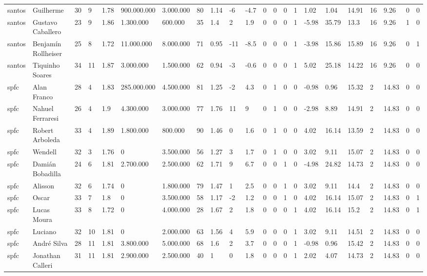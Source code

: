 \begin{longtable}{llllllllllllllllllllll}
santos & Guilherme & 30 & 9 & 1.78 & 900.000.000 & 3.000.000 & 80 & 1.14 & -6 & -4.7 & 0 & 0 & 0 & 1 & 1.02 & 1.04 & 14.91 & 16 & 9.26 & 0 & 0 \\
santos & Gustavo Caballero & 23 & 9 & 1.86 & 1.300.000 & 600.000 & 35 & 1.4 & 2 & 1.9 & 0 & 0 & 0 & 1 & -5.98 & 35.79 & 13.3 & 16 & 9.26 & 1 & 0 \\
santos & Benjamín Rollheiser & 25 & 8 & 1.72 & 11.000.000 & 8.000.000 & 71 & 0.95 & -11 & -8.5 & 0 & 0 & 0 & 1 & -3.98 & 15.86 & 15.89 & 16 & 9.26 & 0 & 1 \\
santos & Tiquinho Soares & 34 & 11 & 1.87 & 3.000.000 & 1.500.000 & 62 & 0.94 & -3 & -0.6 & 0 & 0 & 0 & 1 & 5.02 & 25.18 & 14.22 & 16 & 9.26 & 0 & 0 \\
spfc & Alan Franco & 28 & 4 & 1.83 & 285.000.000 & 4.500.000 & 81 & 1.25 & -2 & 4.3 & 0 & 1 & 0 & 0 & -0.98 & 0.96 & 15.32 & 2 & 14.83 & 0 & 0 \\
spfc & Nahuel Ferraresi & 26 & 4 & 1.9 & 4.300.000 & 3.000.000 & 77 & 1.76 & 11 & 9 & 0 & 1 & 0 & 0 & -2.98 & 8.89 & 14.91 & 2 & 14.83 & 0 & 0 \\
spfc & Robert Arboleda & 33 & 4 & 1.89 & 1.800.000 & 800.000 & 90 & 1.46 & 0 & 1.6 & 0 & 1 & 0 & 0 & 4.02 & 16.14 & 13.59 & 2 & 14.83 & 0 & 0 \\
spfc & Wendell & 32 & 3 & 1.76 & 0 & 3.500.000 & 56 & 1.27 & 3 & 1.7 & 0 & 1 & 0 & 0 & 3.02 & 9.11 & 15.07 & 2 & 14.83 & 0 & 0 \\
spfc & Damián Bobadilla & 24 & 6 & 1.81 & 2.700.000 & 2.500.000 & 62 & 1.71 & 9 & 6.7 & 0 & 0 & 1 & 0 & -4.98 & 24.82 & 14.73 & 2 & 14.83 & 0 & 0 \\
spfc & Alisson & 32 & 6 & 1.74 & 0 & 1.800.000 & 79 & 1.47 & 1 & 2.5 & 0 & 0 & 1 & 0 & 3.02 & 9.11 & 14.4 & 2 & 14.83 & 0 & 0 \\
spfc & Oscar & 33 & 7 & 1.8 & 0 & 3.500.000 & 58 & 1.17 & -2 & 1.2 & 0 & 0 & 1 & 0 & 4.02 & 16.14 & 15.07 & 2 & 14.83 & 0 & 1 \\
spfc & Lucas Moura & 33 & 8 & 1.72 & 0 & 4.000.000 & 28 & 1.67 & 2 & 1.8 & 0 & 0 & 0 & 1 & 4.02 & 16.14 & 15.2 & 2 & 14.83 & 0 & 1 \\
spfc & Luciano & 32 & 10 & 1.81 & 0 & 2.000.000 & 63 & 1.56 & 4 & 5.9 & 0 & 0 & 0 & 1 & 3.02 & 9.11 & 14.51 & 2 & 14.83 & 0 & 0 \\
spfc & André Silva & 28 & 11 & 1.81 & 3.800.000 & 5.000.000 & 68 & 1.6 & 2 & 3.7 & 0 & 0 & 0 & 1 & -0.98 & 0.96 & 15.42 & 2 & 14.83 & 0 & 0 \\
spfc & Jonathan Calleri & 31 & 11 & 1.81 & 2.900.000 & 2.500.000 & 40 & 1 & 0 & 1.8 & 0 & 0 & 0 & 1 & 2.02 & 4.07 & 14.73 & 2 & 14.83 & 0 & 0 \\

\end{longtable}
